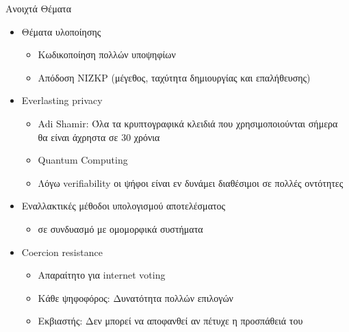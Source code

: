 \documentclass[handout]{beamer}
\begin{document}
\begin{frame}{Ανοιχτά Θέματα} 
\begin{adjustwidth}{-2em}{-2em}
    \begin{multicols}{2}
    \begin{small}
    \begin{itemize}
    \setlength\itemsep{0.1em}
        \item Θέματα υλοποίησης
        \begin{itemize}\setlength\itemsep{0.1em}
            \item Κωδικοποίηση πολλών υποψηφίων
            \item Απόδοση NIZKP (μέγεθος, ταχύτητα δημιουργίας και επαλήθευσης)
        \end{itemize} \pause
        \item Everlasting privacy
        \begin{itemize}\setlength\itemsep{0.1em}
            \item Adi Shamir: Όλα τα κρυπτογραφικά κλειδιά που χρησιμοποιούνται σήμερα θα είναι άχρηστα σε 30 χρόνια
            \item Quantum Computing
            \item Λόγω verifiability οι ψήφοι είναι εν δυνάμει διαθέσιμοι σε πολλές οντότητες
        \end{itemize} \pause
        \columnbreak
        \item Εναλλακτικές μέθοδοι υπολογισμού αποτελέσματος
        \begin{itemize}\setlength\itemsep{0.1em}
            \item σε συνδυασμό με ομομορφικά συστήματα
        \end{itemize} \pause
        \item Coercion resistance 
        \begin{itemize}\setlength\itemsep{0.1em}
            \item Απαραίτητο για internet voting
            \item Κάθε ψηφοφόρος: Δυνατότητα πολλών επιλογών
            \item Εκβιαστής: Δεν μπορεί να αποφανθεί αν πέτυχε η προσπάθειά του
        \end{itemize}
    \end{itemize}
    \end{small}
    \end{multicols}
    \end{adjustwidth}
\end{frame}
\end{document}
